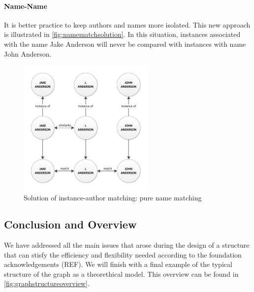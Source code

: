 \paragraph{Name-Name} It is better practice to keep authors and names more isolated. This new approach is illustrated in \autoref{fig:namematchsolution}. In this situation, instances associated with the name Jake Anderson will never be compared with instances with name John Anderson.

\begin{figure}[htb]
	\centering
		\includegraphics[width=0.6\textwidth]{fig/namematchsolution}
	\caption{Solution of instance-author matching: pure name matching}
	\label{fig:namematchsolution}
\end{figure}

\subsection{Conclusion and Overview}

We have addressed all the main issues that arose during the design of a structure that can stisfy the efficiency and flexibility needed according to the foundation acknowledgements (REF). We will finish with a final example of the typical structure of the graph as a theorethical model. This overview can be found in \autoref{fig:graphstructureoverview}.

